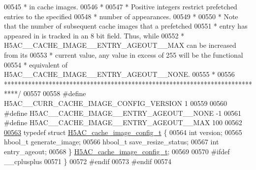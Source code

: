 \begin{DoxyCode}
00545 \textcolor{comment}{ *  in cache images.}
00546 \textcolor{comment}{ *}
00547 \textcolor{comment}{ *  Positive integers restrict prefetched entries to the specified}
00548 \textcolor{comment}{ *  number of appearances.}
00549 \textcolor{comment}{ *}
00550 \textcolor{comment}{ *  Note that the number of subsequent cache images that a prefetched}
00551 \textcolor{comment}{ *  entry has appeared in is tracked in an 8 bit field.  Thus, while}
00552 \textcolor{comment}{ *  H5AC\_\_CACHE\_IMAGE\_\_ENTRY\_AGEOUT\_\_MAX can be increased from its }
00553 \textcolor{comment}{ *  current value, any value in excess of 255 will be the functional }
00554 \textcolor{comment}{ *  equivalent of H5AC\_\_CACHE\_IMAGE\_\_ENTRY\_AGEOUT\_\_NONE.}
00555 \textcolor{comment}{ *}
00556 \textcolor{comment}{ ****************************************************************************/}
00557 
00558 \textcolor{preprocessor}{#define H5AC\_\_CURR\_CACHE\_IMAGE\_CONFIG\_VERSION   1}
00559 
00560 \textcolor{preprocessor}{#define H5AC\_\_CACHE\_IMAGE\_\_ENTRY\_AGEOUT\_\_NONE   -1}
00561 \textcolor{preprocessor}{#define H5AC\_\_CACHE\_IMAGE\_\_ENTRY\_AGEOUT\_\_MAX    100}
00562 
\hyperlink{struct_h5_a_c__cache__image__config__t}{00563} \textcolor{keyword}{typedef} \textcolor{keyword}{struct }\hyperlink{struct_h5_a_c__cache__image__config__t}{H5AC\_cache\_image\_config\_t} \{
00564     \textcolor{keywordtype}{int}                                 version;
00565     hbool\_t                             generate\_image;
00566     hbool\_t                             save\_resize\_status;
00567     \textcolor{keywordtype}{int}                                 entry\_ageout;
00568 \} \hyperlink{struct_h5_a_c__cache__image__config__t}{H5AC\_cache\_image\_config\_t};
00569 
00570 \textcolor{preprocessor}{#ifdef \_\_cplusplus}
00571 \}
00572 \textcolor{preprocessor}{#endif}
00573 \textcolor{preprocessor}{#endif}
00574 
\end{DoxyCode}
